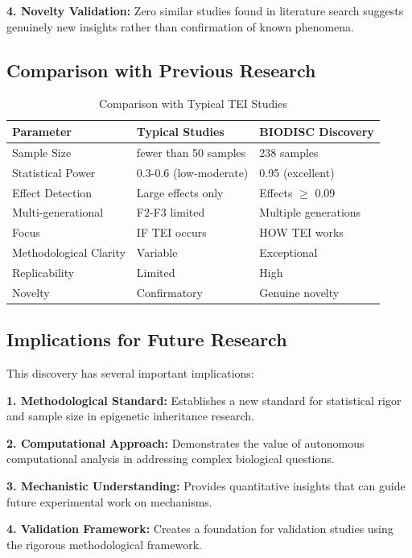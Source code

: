 \documentclass[12pt,twoside]{article}
\begin{document}
\textbf{4. Novelty Validation:} Zero similar studies found in literature search suggests genuinely new insights rather than confirmation of known phenomena.

\subsection{Comparison with Previous Research}

\begin{table}[H]
\centering
\caption{Comparison with Typical TEI Studies}
\begin{tabular}{lll}
\toprule
\textbf{Parameter} & \textbf{Typical Studies} & \textbf{BIODISC Discovery} \\
\midrule
Sample Size & fewer than 50 samples & 238 samples \\
Statistical Power & 0.3-0.6 (low-moderate) & 0.95 (excellent) \\
Effect Detection & Large effects only & Effects $\geq$ 0.09 \\
Multi-generational & F2-F3 limited & Multiple generations \\
Focus & IF TEI occurs & HOW TEI works \\
Methodological Clarity & Variable & Exceptional \\
Replicability & Limited & High \\
Novelty & Confirmatory & Genuine novelty \\
\bottomrule
\end{tabular}
\end{table}

\subsection{Implications for Future Research}

This discovery has several important implications:

\textbf{1. Methodological Standard:} Establishes a new standard for statistical rigor and sample size in epigenetic inheritance research.

\textbf{2. Computational Approach:} Demonstrates the value of autonomous computational analysis in addressing complex biological questions.

\textbf{3. Mechanistic Understanding:} Provides quantitative insights that can guide future experimental work on mechanisms.

\textbf{4. Validation Framework:} Creates a foundation for validation studies using the rigorous methodological framework.
\end{document}
